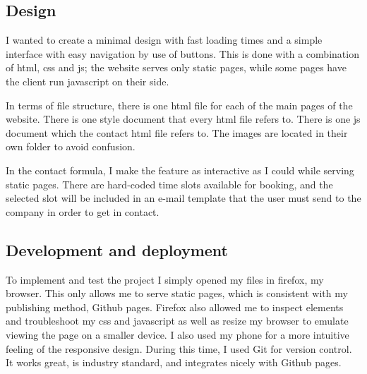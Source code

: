 \documentclass[12pt, a4paper]{article}
\begin{document}
\begin{center}
\begin{minipage}{0.8\paperwidth}
                \subsection{Design}
                I wanted to create a minimal design with fast loading times and a simple interface with easy navigation by use of buttons. This is done with a combination of html, css and js; the website serves only static pages, while some pages have the client run javascript on their side.

                In terms of file structure, there is one html file for each of the main pages of the website. There is one style document that every html file refers to. There is one js document which the contact html file refers to. The images are located in their own folder to avoid confusion.

                In the contact formula, I make the feature as interactive as I could while serving static pages. There are hard-coded time slots available for booking, and the selected slot will be included in an e-mail template that the user must send to the company in order to get in contact.

                \subsection{Development and deployment}
                To implement and test the project I simply opened my files in firefox, my browser. This only allows me to serve static pages, which is consistent with my publishing method, Github pages. Firefox also allowed me to inspect elements and troubleshoot my css and javascript as well as resize my browser to emulate viewing the page on a smaller device. I also used my phone for a more intuitive feeling of the responsive design. During this time, I used Git for version control. It works great, is industry standard, and integrates nicely with Github pages.
    \end{minipage}
\end{center}
\vfill
\hspace{0pt}
\end{document}

